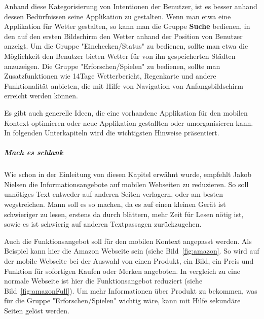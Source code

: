 Anhand diese Kategorisierung von Intentionen der Benutzer, ist es besser anhand dessen Bedürfnissen seine Applikation zu gestalten. Wenn man etwa eine Applikation für Wetter gestalten, so kann man die Gruppe \textbf{Suche} bedienen, in den auf den ersten Bildschirm den Wetter anhand der Position von Benutzer anzeigt. Um die Gruppe "Einchecken/Status" zu bedienen, sollte man etwa die Möglichkeit den Benutzer bieten Wetter für von ihn gespeicherten Städten anzuzeigen. Die Gruppe "Erforschen/Spielen" zu bedienen, sollte man Zusatzfunktionen wie 14Tage Wetterbericht, Regenkarte und andere Funktionalität anbieten, die mit Hilfe von Navigation von Anfangsbildschirm erreicht werden können.

Es gibt auch generelle Ideen, die eine vorhandene Applikation für den mobilen Kontext optimieren oder neue Applikation gestallten oder umorganisieren kann. In folgenden Unterkapiteln wird die wichtigsten Hinweise präsentiert. 

\subparagraph{Mach es schlank} 
\label{subp:entferne_das_fett}

Wie schon in der Einleitung von diesen Kapitel erwähnt wurde, empfehlt Jakob Nielsen die Informationsangebote auf mobilen Webseiten zu reduzieren. So soll unnötiges Text entweder auf anderen Seiten verlagern, oder am besten wegstreichen. Mann soll es so machen, da es auf einen kleinen Gerät ist schwieriger zu lesen\cite[Seite 102]{Nielsen:2012wj}, erstens da durch blättern, mehr Zeit für Lesen nötig ist, sowie es ist schwierig auf anderen Textpassagen zurückzugehen.

 Auch die Funktionsangebot soll für den mobilen Kontext angepasst werden. Als Beispiel kann hier die Amazon Webseite sein (siehe Bild~\ref{fig:amazon}. So wird auf der mobile Webseite bei der Auswahl von einen Produkt, ein Bild, ein Preis und Funktion für sofortigen Kaufen oder Merken angeboten. In vergleich zu eine normale Webseite ist hier die Funktionsangebot reduziert (siehe Bild~\ref{fig:amazonFull}). Um mehr Informationen über Produkt zu bekommen, was für die Gruppe "Erforschen/Spielen" wichtig wäre, kann mit Hilfe sekundäre Seiten gelöst werden.

